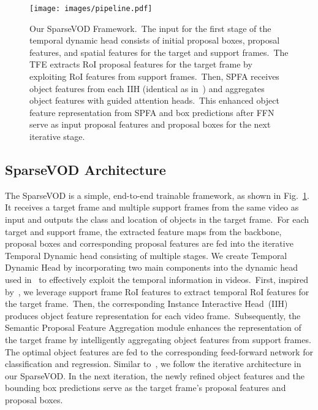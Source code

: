 \documentclass{bmvc2k}
\begin{document}
\begin{figure} 
\vspace{-3pt}
\texttt{[image: images/pipeline.pdf]}
\caption{Our SparseVOD Framework.~The input for the first stage of the temporal dynamic head consists of initial proposal boxes, proposal features, and spatial features for the target and support frames.~The TFE extracts RoI proposal features for the target frame by exploiting RoI features from support frames.~Then, SPFA receives object features from each IIH (identical as in~\cite{sun2021sparse}) and aggregates object features with guided attention heads.~This enhanced object feature representation from SPFA and box predictions after FFN serve as input proposal features and proposal boxes for the next iterative stage.}
\label{fig:pipeline}
\vspace{-16pt}
\end{figure}

\subsection{SparseVOD Architecture}
\label{subsec:sparseVOD}
The SparseVOD is a simple, end-to-end trainable framework, as shown in Fig.~\ref{fig:pipeline}. It receives a target frame and multiple support frames from the same video as input and outputs the class and location of objects in the target frame.~For each target and support frame, the extracted feature maps from the backbone, proposal boxes and corresponding proposal features are fed into the iterative Temporal Dynamic head consisting of multiple stages. We create Temporal Dynamic Head by incorporating two main components into the dynamic head used in~\cite{sun2021sparse} to effectively exploit the temporal information in videos.~First, inspired by~\cite{gong2021temporal}, we leverage support frame RoI features to extract temporal RoI features for the target frame.~Then, the corresponding Instance Interactive Head~(IIH) produces object feature representation for each video frame.~Subsequently, the Semantic Proposal Feature Aggregation module enhances the representation of the target frame by intelligently aggregating object features from support frames. The optimal object features are fed to the corresponding feed-forward network for classification and regression. Similar to~\cite{sun2021sparse}, we follow the iterative architecture in our SparseVOD. In the next iteration, the newly refined object features and the bounding box predictions serve as the target frame's proposal features and proposal boxes.
\end{document}
